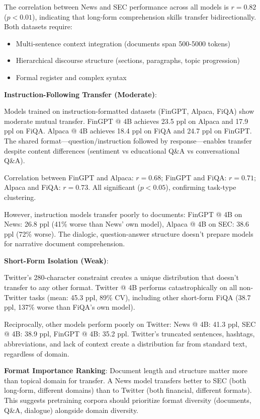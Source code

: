 The correlation between News and SEC performance across all models is $r = 0.82$ ($p < 0.01$), indicating that long-form comprehension skills transfer bidirectionally. Both datasets require:
\begin{itemize}
\item Multi-sentence context integration (documents span 500-5000 tokens)
\item Hierarchical discourse structure (sections, paragraphs, topic progression)
\item Formal register and complex syntax
\end{itemize}

\textbf{Instruction-Following Transfer (Moderate)}:

Models trained on instruction-formatted datasets (FinGPT, Alpaca, FiQA) show moderate mutual transfer. FinGPT @ 4B achieves 23.5 ppl on Alpaca and 17.9 ppl on FiQA. Alpaca @ 4B achieves 18.4 ppl on FiQA and 24.7 ppl on FinGPT. The shared format—question/instruction followed by response—enables transfer despite content differences (sentiment vs educational Q\&A vs conversational Q\&A).

Correlation between FinGPT and Alpaca: $r = 0.68$; FinGPT and FiQA: $r = 0.71$; Alpaca and FiQA: $r = 0.73$. All significant ($p < 0.05$), confirming task-type clustering.

However, instruction models transfer poorly to documents: FinGPT @ 4B on News: 26.8 ppl (41\% worse than News' own model), Alpaca @ 4B on SEC: 38.6 ppl (72\% worse). The dialogic, question-answer structure doesn't prepare models for narrative document comprehension.

\textbf{Short-Form Isolation (Weak)}:

Twitter's 280-character constraint creates a unique distribution that doesn't transfer to any other format. Twitter @ 4B performs catastrophically on all non-Twitter tasks (mean: 45.3 ppl, 89\% CV), including other short-form FiQA (38.7 ppl, 137\% worse than FiQA's own model).

Reciprocally, other models perform poorly on Twitter: News @ 4B: 41.3 ppl, SEC @ 4B: 38.9 ppl, FinGPT @ 4B: 35.2 ppl. Twitter's truncated sentences, hashtags, abbreviations, and lack of context create a distribution far from standard text, regardless of domain.

\textbf{Format Importance Ranking}: Document length and structure matter more than topical domain for transfer. A News model transfers better to SEC (both long-form, different domains) than to Twitter (both financial, different formats). This suggests pretraining corpora should prioritize format diversity (documents, Q\&A, dialogue) alongside domain diversity.

